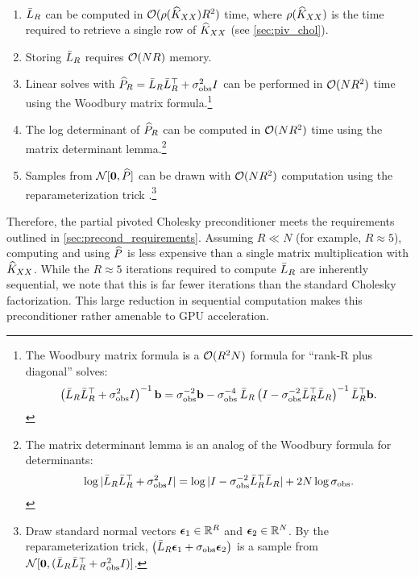 \begin{observation}
  {\ }
  \begin{enumerate}
    \item $\bar{L}_{R}$ can be computed in $\bigo{\row{\trainK}R^{2}}$ time, where $\rho ( \widehat{K}_{XX} )$ is the time required to retrieve a single row of $\widehat{K}_{XX}$
      (see \cref{sec:piv_chol}).

    \item Storing $\bar{L}_{R}$ requires $\bigo{NR}$ memory.

    \item Linear solves with $\widehat{P}_R = \bar{L}_{R} \bar{L}_{R}^{\top} + \sigma_\text{obs}^{2} I$ can be performed in $\bigo{NR^{2}}$ time using the Woodbury matrix formula.\footnote{
      The Woodbury matrix formula is a $\bigo{R^2 N}$ formula for ``rank-R plus diagonal'' solves:
      $$\left( \bar{L}_{R} \bar{L}_{R}^{\top} + \sigma^{2}_\text{obs} I \right)^{-1} \mathbf{b} = {\sigma_\text{obs}^{-2}}\mathbf{b} - {\sigma_\text{obs}^{-4}} \: \bar{L}_{R} \left( I - {\sigma^{-2}_\text{obs}} \bar{L}_{R}^{\top} \bar{L}_{R} \right)^{-1} \bar{L}_{R}^{\top}\mathbf{b}.$$
    }

    \item The log determinant of $\widehat{P}_R$ can be computed in $\bigo{NR^{2}}$ time using the matrix determinant lemma.\footnote{
      The matrix determinant lemma is an analog of the Woodbury formula for determinants:
      $$\log \vert \bar{L}_{R} \bar{L}_{R}^\top + \sigma^{2}_\text{obs} I \vert = \log \vert I - {\sigma_\text{obs}^{-2}} \bar{L}_{R}^{\top} \bar{L}_{R} \vert + 2 N \log \sigma_\text{obs}.$$
    }

  \item Samples from $\normaldist{ \bzero}{ \trainP }$ can be drawn with $\bigo{NR^2}$ computation using the reparameterization trick \cite{kingma2014auto}.\footnote{
      Draw standard normal vectors $\boldsymbol{\epsilon}_1 \in \mathbb{R}^R$ and $\boldsymbol{\epsilon}_2 \in \mathbb{R}^N$.
      By the reparameterization trick, $\left( \bar{L}_R \boldsymbol{\epsilon}_1 + \sigma_\text{obs} \boldsymbol{\epsilon}_2 \right)$ is a sample from $\normaldist{ \bzero}{( \bar\bL_R \bar\bL_R^\top + \sigma^2_\text{obs} \bI )}$.
    }
  \end{enumerate}
\end{observation}
%
\noindent
Therefore, the partial pivoted Cholesky preconditioner meets the requirements outlined in \cref{sec:precond_requirements}.
Assuming $R \ll N$ (for example, $R \approx 5$), computing and using $\widehat{P}$ is less expensive than a single matrix multiplication with $\widehat{K}_{XX}$.
While the $R \approx 5$ iterations required to compute $\bar{L}_R$ are inherently sequential, we note that this is far fewer iterations than the standard Cholesky factorization.
This large reduction in sequential computation makes this preconditioner rather amenable to GPU acceleration.

